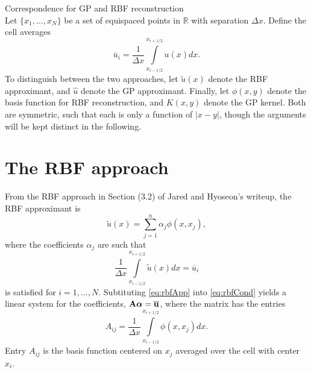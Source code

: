 \documentclass{article}
\providecommand{\mat}[1]{ {\rm\bf #1} }
\begin{document}
{\centering Correspondence for GP and RBF reconstruction\\}
Let $\lbrace x_1,\ldots,x_N\rbrace$ be a set of equispaced points in $\mathbb{R}$ with separation $\Delta x$. Define the cell averages
\begin{equation}
  \overline{u}_i = \frac{1}{\Delta x}\int\limits_{x_{i-1/2}}^{x_{i+1/2}}u(x)dx.
\end{equation}
To distinguish between the two approaches, let $\widetilde{u}(x)$ denote the RBF approximant, and $\hat{u}$ denote the GP approximant. Finally, let $\phi(x,y)$ denote the basis function for RBF reconstruction, and $K(x,y)$ denote the GP kernel. Both are symmetric, such that each is only a function of $\left|x-y\right|$, though the arguments will be kept distinct in the following.

\section*{The RBF approach}
From the RBF approach in Section (3.2) of Jared and Hyoseon's writeup, the RBF approximant is
\begin{equation}
  \widetilde{u}(x) = \sum\limits_{j=1}^n \alpha_j\phi(x,x_j),
  \label{eq:rbfApp}
\end{equation}
where the coefficients $\alpha_j$ are such that
\begin{equation}
  \frac{1}{\Delta x}\int\limits_{x_{i-1/2}}^{x_{i+1/2}} \widetilde{u}(x)dx = \overline{u}_i
  \label{eq:rbfCond}
\end{equation}
is satisfied for $i=1,\ldots,N$. Subtituting \eqref{eq:rbfApp} into \eqref{eq:rbfCond} yields a linear system for the coefficients, $\mat{A}\bm{\alpha} = \overline{\mat{u}}$, where the matrix has the entries
\begin{equation}
  A_{ij} = \frac{1}{\Delta x}\int\limits_{x_{i-1/2}}^{x_{i+1/2}} \phi(x,x_j)dx.
\end{equation}
Entry $A_{ij}$ is the basis function centered on $x_j$ averaged over the cell with center $x_i$.

\end{document}
